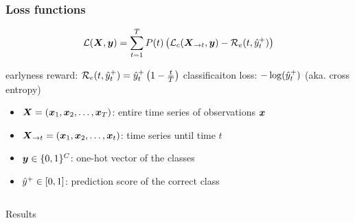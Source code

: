 \begin{frame}
	\frametitle{Loss functions}
	
	{
	\Large
	
	\begin{equation*}
		\mathcal{L}(\M{X}, \V{y}) = \sum_{t=1}^{T} P(t) \left( \mathcal{L}_c (\xuptot, \V{y}) - \mathcal{R}_e(t, \ycorrect_t) \right)
	\end{equation*} 
	
	earlyness reward: $ \mathcal{R}_e(t, \hat{y}^+_t) = \hat{y}^+_t \left(1 - \frac{t}{T}\right) $	
	classificaiton loss: $-\log(\hat{y}^+_t)$ (aka. cross entropy)
	
	}

	\vspace{1em}

	\Large
	\begin{itemize}
		\item $\M{X}=(\V{x}_1,\V{x}_2,\dots,\V{x}_T)$: entire time series of observations $\V{x}$
		\item $\xuptot=(\V{x}_1,\V{x}_2,\dots,\V{x}_t)$: time series until time $t$
		\item $\V{y} \in \{0,1\}^C$: one-hot vector of the classes
		\item $\hat{y}^+ \in [0,1]$: prediction score of the correct class
	\end{itemize}
	
	
\end{frame}

{
	\begin{frame}[plain]
	
	\vfill
	\Huge\color{white}
	\begin{center}
		\begin{columns}
			\vspace{7em}
			
			\hfill 
			Results
			
		\end{columns}
	\end{center}
	
	\vfill
\end{frame}
}

%

